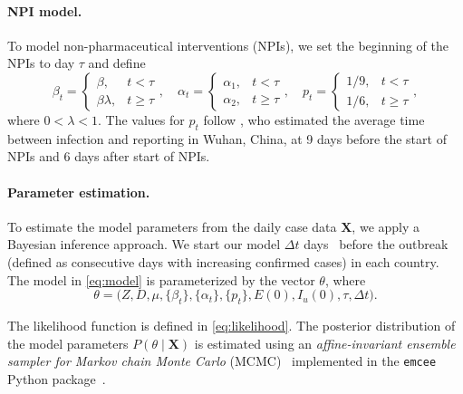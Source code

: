 \documentclass[12pt]{extarticle}
\let\vec\mathbf
\begin{document}
\paragraph*{NPI model.}
To model non-pharmaceutical interventions (NPIs), we set the beginning of the NPIs to day $\tau$ and define
\begin{equation} \label{eq:NPI_model}
\beta_t = \begin{cases} 
  \beta, & t < \tau \\ %
  \beta \lambda, & t \ge \tau
\end{cases},
\quad
\alpha_t = \begin{cases} 
  \alpha_1, & t < \tau \\ %
  \alpha_2, & t \ge \tau
\end{cases},
\quad
p_t = \begin{cases} 
  1/9, & t < \tau \\ %
  1/6, & t \ge \tau
\end{cases},
\end{equation}
where $0 < \lambda < 1$.
The values for $p_t$ follow \citet{Li2020}, who estimated the average time between infection and reporting in Wuhan, China, at 9 days before the start of NPIs and 6 days after start of NPIs.



\paragraph*{Parameter estimation.}
To estimate the model parameters from the daily case data $\vec{X}$, we apply a Bayesian inference approach.
We start our model $\Delta t$ days~\citep{Gatto2020} before the outbreak (defined as consecutive days with increasing confirmed cases) in each country.
The model in \autoref{eq:model} is parameterized by the vector $\theta$, where
\begin{equation} \label{eq:theta}
\theta=\Big(Z, D, \mu, \{\beta_t\}, \{\alpha_t\}, \{p_t\}, E(0), I_u(0), \tau, \Delta t \Big).
\end{equation} 

The likelihood function is defined in \autoref{eq:likelihood}.
The posterior distribution of the model parameters $P(\theta \mid \vec{X})$ is estimated using an \textit{affine-invariant ensemble sampler for Markov chain Monte Carlo} (MCMC)~\citep{Goodman2010} implemented in the \texttt{emcee} Python package~\citep{Foreman-Mackey2013}.
\end{document}
